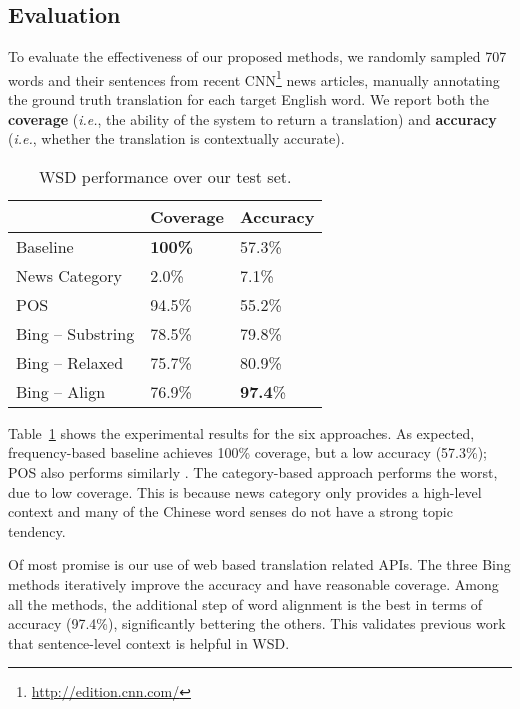 \begin{CJK}{UTF8}{gbsn}
\subsection{Evaluation}
To evaluate the effectiveness of our proposed methods, we randomly
sampled 707 words and their sentences from recent
CNN\footnote{\url{http://edition.cnn.com/}} news articles, manually
annotating the ground truth translation for each target English
word. We report both the {\bf coverage} ({\it i.e.}, the ability of
the system to return a translation) and {\bf accuracy} ({\it i.e.},
whether the translation is contextually accurate).

\begin{table}[t]
\centering
  \caption{WSD performance over our test set.}
  \label{table:evaluation_1}
  \begin{tabular}{| p{2.7cm} | p{1.7cm} | p{1.7cm} |}
    \hline
     & {\bf Coverage} & {\bf Accuracy}\\
    \hline
    Baseline & {\bf 100\%} & 57.3\%\\
    \hline
    News Category & 2.0\% & 7.1\%\\
    \hline
    POS & 94.5\% & 55.2\%\\
    \hline
    Bing -- Substring & 78.5\% & 79.8\%\\
    \hline
    Bing -- Relaxed  & 75.7\% & 80.9\%\\
    \hline
    Bing -- Align & 76.9\% & {\bf 97.4}\%\\
    \hline
  \end{tabular}
\end{table}

Table~\ref{table:evaluation_1} shows the experimental results for the
six approaches.  As expected, frequency-based baseline achieves 100\%
coverage, but a low accuracy (57.3\%); POS also performs similarly
. The category-based approach performs the worst, due to low coverage.
This is because news category only provides a high-level context and
many of the Chinese word senses do not have a strong topic tendency.

Of most promise is our use of web based translation related APIs.  The
three Bing methods iteratively improve the accuracy and have
reasonable coverage. Among all the methods, the additional step of
word alignment is the best in terms of accuracy (97.4\%),
significantly bettering the others. This validates previous work that
sentence-level context is helpful in WSD.



\end{CJK}
